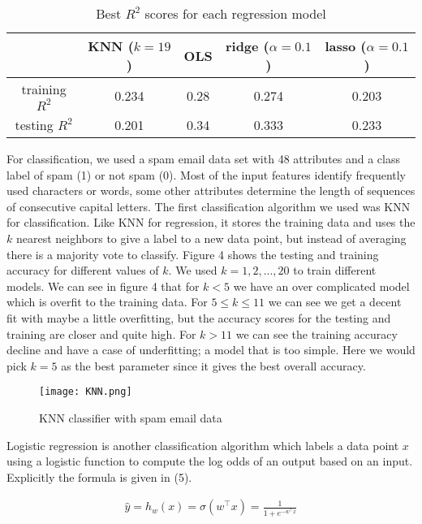 \documentclass[12pt,letterpaper]{article}
\begin{document}
\begin{table}[h!]
	\centering
	\begin{tabular}{ c|cccc } 
	\hline
	&KNN  ($ k=19 $) & OLS& ridge ($\alpha=0.1$)& lasso ($\alpha=0.1$)\\ \hline
	training $R^2$ & 0.234 & 0.28 & 0.274 & 0.203\\ 
	testing $R^2$ & 0.201 & 0.34 & 0.333 & 0.233\\ 
	\hline
\end{tabular}
	\caption{ Best $R^2$ scores for each regression model}
	\label{table: 1}
\end{table}

\pagebreak

For classification, we used a spam email data set with 48 attributes and a class label of spam (1) or not spam (0). Most of the input features identify frequently used characters or words, some other attributes determine the length of sequences of consecutive capital letters. The first classification algorithm we used was KNN for classification. Like KNN for regression, it stores the training data and uses the $ k $ nearest neighbors to give a label to a new data point, but instead of averaging there is a majority vote to classify. Figure 4 shows the testing and training accuracy for different values of $k$. We used $k=1,2,..., 20$ to train different models. We can see in figure 4 that for $k<5$ we have an over complicated model which is overfit to the training data. For $5\le k\le 11$ we can see we get a decent fit with maybe a little overfitting, but the accuracy scores for the testing and training are closer and quite high. For $k>11$ we can see the training accuracy decline and have a case of underfitting; a model that is too simple. Here we would pick $k=5$ as the best parameter since it gives the best overall accuracy.

\begin{figure}[h]
	\centering
	\texttt{[image: KNN.png]}
	\caption{KNN classifier with spam email data}
\end{figure}

Logistic regression is another classification algorithm which labels a data point $x$ using a logistic function to compute the log odds of an output based on an input. Explicitly the formula is given in (5).

\begin{align}
	\hat{y}=h_w(x)=\sigma(w^\top x)=\frac{1}{1+e^{-w^\top x}}
\end{align}
\end{document}
